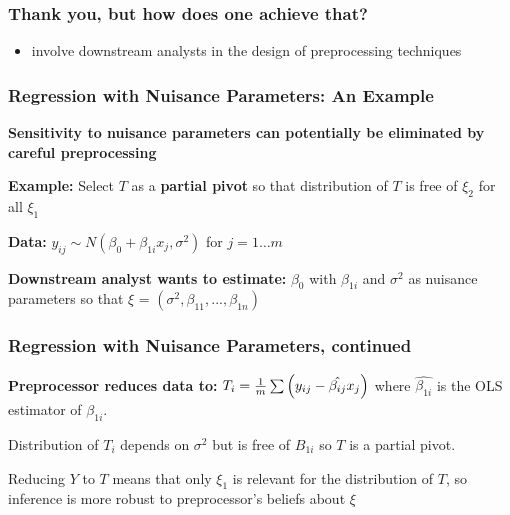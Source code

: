 \documentclass[10pt, compress]{beamer}
\begin{document}
\begin{frame}[fragile]
    \frametitle{Thank you, but how does one achieve that?}
    \begin{itemize}
        \item involve downstream analysts in the design of preprocessing techniques
    \end{itemize}
\end{frame}

\begin{frame}[fragile]

    \frametitle{Regression with Nuisance Parameters: An Example}
    
    \textbf{Sensitivity to nuisance parameters can potentially be eliminated by careful preprocessing}

    \vspace*{5mm}
    
    \textbf{Example:} Select $T$ as a \textbf{partial pivot} so that distribution of $T$ is free of $\xi_2$ for all $\xi_1$ 

    \vspace*{5mm}
    
    \textbf{Data:} $y_{ij} \sim N(\beta_0 + \beta_{1i}x_j, \sigma^2)$ for $j = 1 \ldots m$
    
    \textbf{Downstream analyst wants to estimate:} $\beta_0$ with $\beta_{1i}$ and $\sigma^2$ as nuisance parameters so that $\xi$ = $(\sigma^2, \beta_{11}, ..., \beta_{1n})$
    
\end{frame}

\begin{frame}[fragile]
    \frametitle{Regression with Nuisance Parameters, continued}
   
    \textbf{Preprocessor reduces data to:} $T_i = \frac{1}{m}\sum\del{y_{ij} - \hat{\beta_{ij}}x_j}$ where $\hat{\beta_{1i}}$ is the OLS estimator of $\beta_{1i}$.
    
    \vspace*{5mm}
    
    Distribution of $T_i$ depends on $\sigma^2$ but is free of $B_{1i}$ so $T$ is a partial pivot. 
    
    Reducing $Y$ to $T$ means that only $\xi_1$ is relevant for the distribution of $T$, so inference is more robust to preprocessor's beliefs about $\xi$
    
    
    
\end{frame}
\end{document}
